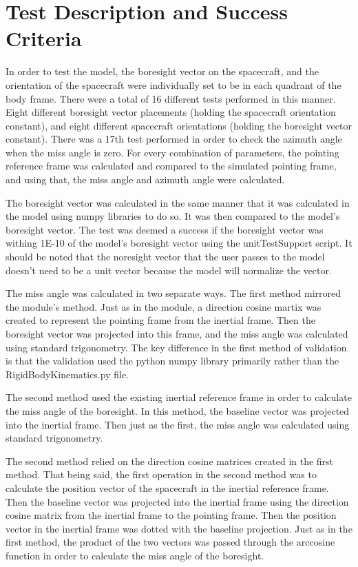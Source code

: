\section{Test Description and Success Criteria}
In order to test the model, the boresight vector on the spacecraft, and the orientation of the spacecraft were individually set to be in each quadrant of the body frame. There were a total of 16 different tests performed in this manner. Eight different boresight vector placements (holding the spacecraft orientation constant), and eight different spacecraft orientations (holding the boresight vector constant). There was a 17th test performed in order to check the azimuth angle when the miss angle is zero. For every combination of parameters, the pointing reference frame was calculated and compared to the simulated pointing frame, and using that, the miss angle and azimuth angle were calculated.

The boresight vector was calculated in the same manner that it was calculated in the model using numpy libraries to do so. It was then compared to the model's boresight vector. The test was deemed a success if the boresight vector was withing 1E-10 of the model's boresight vector using the unitTestSupport script. It should be noted that the noresight vector that the user passes to the model doesn't need to be a unit vector because the model will normalize the vector.  

The miss angle was calculated in two separate ways. The first method mirrored the module's method. Just as in the module, a direction cosine martix was created to represent the pointing frame from the inertial frame. Then the boresight vector was projected into this frame, and the miss angle was calculated using standard trigonometry. The key difference in the first method of validation is that the validation used the python numpy library primarily rather than the RigidBodyKinematics.py file.  

The second method used the existing inertial reference frame in order to calculate the miss angle of the boresight. In this method, the baseline vector was projected into the inertial frame. Then just as the first, the miss angle was calculated using standard trigonometry.

The second method relied on the direction cosine matrices created in the first method. That being said, the first operation in the second method was to calculate the position vector of the spacecraft in the inertial reference frame. Then the baseline vector was projected into the inertial frame using the direction cosine matrix from the inertial frame to the pointing frame. Then the position vector in the inertial frame was dotted with the baseline projection. Just as in the first method, the product of the two vectors was passed through the arccosine function in order to calculate the miss angle of the boresight. 

